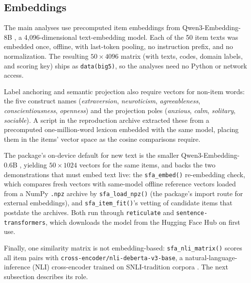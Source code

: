 \subsection{Embeddings}

The main analyses use precomputed item embeddings from Qwen3-Embedding-8B \citep{qwen-2025}, a 4,096-dimensional text-embedding model. Each of the 50 item texts was embedded once, offline, with last-token pooling, no instruction prefix, and no normalization. The resulting $50 \times 4096$ matrix (with texts, codes, domain labels, and scoring key) ships as \texttt{data(big5)}, so the analyses need no Python or network access.

Label anchoring and semantic projection also require vectors for non-item words: the five construct names (\emph{extraversion}, \emph{neuroticism}, \emph{agreeableness}, \emph{conscientiousness}, \emph{openness}) and the projection poles (\emph{anxious}, \emph{calm}, \emph{solitary}, \emph{sociable}). A script in the reproduction archive extracted these from a precomputed one-million-word lexicon embedded with the same model, placing them in the items' vector space as the cosine comparisons require.

The package's on-device default for new text is the smaller Qwen3-Embedding-0.6B \citep{qwen-2025}, yielding $50 \times 1024$ vectors for the same items, and backs the two demonstrations that must embed text live: the \texttt{sfa\_embed()} re-embedding check, which compares fresh vectors with same-model offline reference vectors loaded from a NumPy \texttt{.npz} archive by \texttt{sfa\_load\_npz()} (the package's import route for external embeddings), and \texttt{sfa\_item\_fit()}'s vetting of candidate items that postdate the archives. Both run through \texttt{reticulate} and \texttt{sentence-transformers}, which downloads the model from the Hugging Face Hub on first use.

Finally, one similarity matrix is not embedding-based: \texttt{sfa\_nli\_matrix()} scores all item pairs with \texttt{cross-encoder/nli-deberta-v3-base}, a natural-language-inference (NLI) cross-encoder trained on SNLI-tradition corpora \citep{bowman-etal-2015}. The next subsection describes its role.
